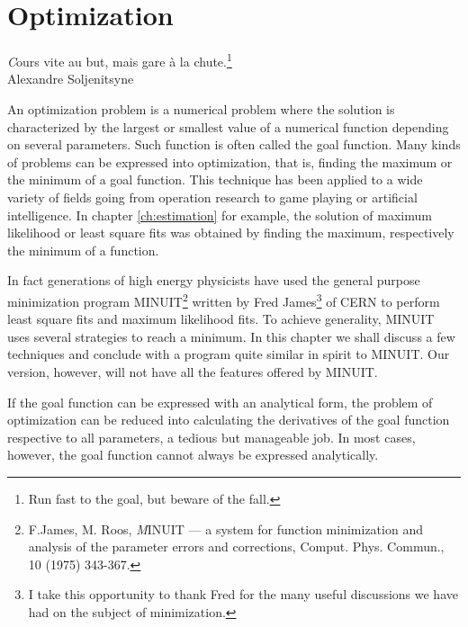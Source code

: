 %
%

\chapter{Optimization}
\label{ch:minimization} \vspace{1 ex}
\begin{flushright}
{\textsl Cours vite au but, mais gare \`a la chute.}\footnote{Run fast
to the goal, but beware of the fall.}\\ Alexandre Soljenitsyne
\end{flushright}
\vspace{1 ex} An optimization problem is a numerical problem where
the solution is characterized by the largest or smallest value of
a numerical function depending on several parameters. Such
function is often called the goal function. Many kinds of problems
can be expressed into optimization, that is, finding the maximum
or the minimum of a goal function. This technique has been applied
to a wide variety of fields going from operation research to game
playing or artificial intelligence. In chapter \ref{ch:estimation}
for example, the solution of maximum likelihood or least square
fits was obtained by finding the maximum, respectively the minimum
of a function.

In fact generations of high energy physicists have used the
general purpose minimization program MINUIT\footnote{F.James, M.
Roos, {\textsl MINUIT --- a system for function minimization and
analysis of the parameter errors and corrections}, Comput. Phys.
Commun., 10 (1975) 343-367.} written by Fred James\footnote{I take
this opportunity to thank Fred for the many useful discussions we
have had on the subject of minimization.} of CERN to perform least
square fits and maximum likelihood fits.  To achieve generality,
MINUIT uses several strategies to reach a minimum. In this chapter
we shall discuss a few techniques and conclude with a program
quite similar in spirit to MINUIT. Our version, however, will not
have all the features offered by MINUIT.

If the goal function can be expressed with an analytical form, the
problem of optimization can be reduced into calculating the
derivatives of the goal function respective to all parameters, a
tedious but manageable job. In most cases, however, the goal
function cannot always be expressed analytically.


